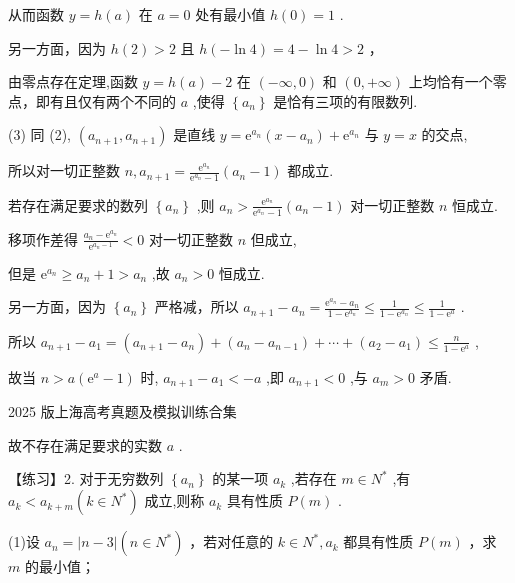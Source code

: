 \documentclass[10pt]{article}
\begin{document}
从而函数 \(y = h\left( a\right)\) 在 \(a = 0\) 处有最小值 \(h\left( 0\right)  = 1\) .

另一方面，因为 \(h\left( 2\right)  > 2\) 且 \(h\left( {-\ln 4}\right)  = 4 - \ln 4 > 2\) ，

由零点存在定理,函数 \(y = h\left( a\right)  - 2\) 在 \(\left( {-\infty ,0}\right)\) 和 \(\left( {0, + \infty }\right)\) 上均恰有一个零点，即有且仅有两个不同的 \(a\) ,使得 \(\left\{  {a}_{n}\right\}\) 是恰有三项的有限数列.

(3) 同 (2), \(\left( {{a}_{n + 1},{a}_{n + 1}}\right)\) 是直线 \(y = {\mathrm{e}}^{{a}_{n}}\left( {x - {a}_{n}}\right)  + {\mathrm{e}}^{{a}_{n}}\) 与 \(y = x\) 的交点,

所以对一切正整数 \(n,{a}_{n + 1} = \frac{{\mathrm{e}}^{{a}_{n}}}{{\mathrm{e}}^{{a}_{n}} - 1}\left( {{a}_{n} - 1}\right)\) 都成立.

若存在满足要求的数列 \(\left\{  {a}_{n}\right\}\) ,则 \({a}_{n} > \frac{{\mathrm{e}}^{{a}_{n}}}{{\mathrm{e}}^{{a}_{n}} - 1}\left( {{a}_{n} - 1}\right)\) 对一切正整数 \(n\) 恒成立.

移项作差得 \(\frac{{a}_{n} - {\mathrm{e}}^{{a}_{n}}}{{\mathrm{e}}^{{a}_{n} - 1}} < 0\) 对一切正整数 \(n\) 但成立,

但是 \({\mathrm{e}}^{{a}_{n}} \geq  {a}_{n} + 1 > {a}_{n}\) ,故 \({a}_{n} > 0\) 恒成立.

另一方面，因为 \(\left\{  {a}_{n}\right\}\) 严格减，所以 \({a}_{n + 1} - {a}_{n} = \frac{{\mathrm{e}}^{{a}_{n}} - {a}_{n}}{1 - {\mathrm{e}}^{{a}_{n}}} \leq  \frac{1}{1 - {\mathrm{e}}^{{a}_{n}}} \leq  \frac{1}{1 - {\mathrm{e}}^{a}}\) .

所以 \({a}_{n + 1} - {a}_{1} = \left( {{a}_{n + 1} - {a}_{n}}\right)  + \left( {{a}_{n} - {a}_{n - 1}}\right)  + \cdots  + \left( {{a}_{2} - {a}_{1}}\right)  \leq  \frac{n}{1 - {\mathrm{e}}^{a}}\) ,

故当 \(n > a\left( {{\mathrm{e}}^{a} - 1}\right)\) 时, \({a}_{n + 1} - {a}_{1} <  - a\) ,即 \({a}_{n + 1} < 0\) ,与 \({a}_{m} > 0\) 矛盾.

2025 版上海高考真题及模拟训练合集

故不存在满足要求的实数 \(a\) .

【练习】2. 对于无穷数列 \(\left\{  {a}_{n}\right\}\) 的某一项 \({a}_{k}\) ,若存在 \(m \in  {N}^{ * }\) ,有 \({a}_{k} < {a}_{k + m}\left( {k \in  {N}^{ * }}\right)\) 成立,则称 \({a}_{k}\) 具有性质 \(P\left( m\right)\) .

(1)设 \({a}_{n} = \left| {n - 3}\right| \left( {n \in  {N}^{ * }}\right)\) ，若对任意的 \(k \in  {N}^{ * },{a}_{k}\) 都具有性质 \(P\left( m\right)\) ，求 \(m\) 的最小值；
\end{document}

